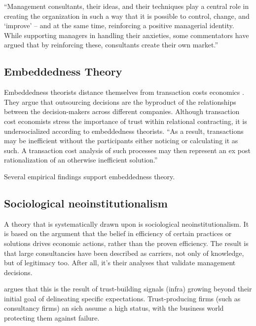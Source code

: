 \documentclass[12pt]{article}
\begin{document}
``Management consultants, their ideas, and their techniques play a
central role in creating the organization in such a way that it is
possible to control, change, and `improve' -- and at the same time,
reinforcing a positive managerial identity. While supporting managers in
handling their anxieties, some commentators have argued that by
reinforcing these, consultants create their own market.'' \citep[
48]{werr2002}

\hypertarget{embeddedness-theory}{%
\subsection{Embeddedness Theory}\label{embeddedness-theory}}

Embeddedness theorists distance themselves from transaction costs
economics \citep[ 14-16]{armbruster2006}. They argue that outsourcing
decisions are the byproduct of the relationships between the
decision-makers across different companies. Although transaction cost
economists stress the importance of trust within relational contracting,
it is undersocialized according to embeddedness theorists. ``As a
result, transactions may be inefficient without the participants either
noticing or calculating it as such. A transaction cost analysis of such
processes may then represent an ex post rationalization of an otherwise
inefficient solution.'' \citep[ 15]{armbruster2006}

Several empirical findings support embeddedness theory.

\hypertarget{sociological-neoinstitutionalism}{%
\subsection{Sociological
neoinstitutionalism}\label{sociological-neoinstitutionalism}}

A theory that is systematically drawn upon \citep[ 6-8]{armbruster2006}
is sociological neoinstitutionalism. It is based on the argument that
the belief in efficiency of certain practices or solutions drives
economic actions, rather than the proven efficiency. The result is that
large consultancies have been described as carriers, not only of
knowledge, but of legitimacy too. After all, it's their analyses that
validate management decisions.

\citet[20-21]{zucker1985} argues that this is the result of
trust-building signals (infra) growing beyond their initial goal of
delineating specific expectations. Trust-producing firms (such as
consultancy firms) an sich assume a high status, with the business world
protecting them against failure.
\end{document}
